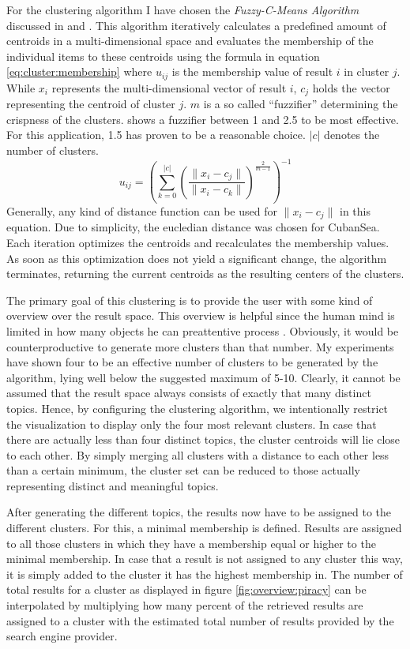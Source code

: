For the clustering algorithm I have chosen the \emph{Fuzzy-C-Means Algorithm} discussed in \cite{Dunn1973} and \cite{Bezdek1981}. This algorithm iteratively calculates a predefined amount of centroids in a multi-dimensional space and evaluates the membership of the individual items to these centroids using the formula in equation \ref{eq:cluster:membership} where $u_{ij}$ is the membership value of result $i$ in cluster $j$. While $x_i$ represents the multi-dimensional vector of result $i$, $c_j$ holds the vector representing the centroid of cluster $j$. $m$ is a so called ``fuzzifier'' determining the crispness of the clusters. \cite{Stutz1999} shows a fuzzifier between 1 and 2.5 to be most effective. For this application, 1.5 has proven to be a reasonable choice. $|c|$ denotes the number of clusters.
\begin{equation}
	u_{ij} = \left(\displaystyle\sum_{k=0}^{|c|} \left(\frac{\|x_i - c_j\|}{\|x_i -c_k\|}\right)^{\frac{2}{m-1}}\right) ^{-1} \label{eq:cluster:membership}
\end{equation}
Generally, any kind of distance function can be used for $\|x_i - c_j\|$ in this equation. Due to simplicity, the eucledian distance  was chosen for CubanSea. Each iteration optimizes the centroids and recalculates the membership values. As soon as this optimization does not yield a significant change, the algorithm terminates, returning the current centroids as the resulting centers of the clusters.

The primary goal of this clustering is to provide the user with some kind of overview over the result space. This overview is helpful since the human mind is limited in how many objects he can preattentive process \cite{Healey1996}. Obviously, it would be counterproductive to generate more clusters than that number. My experiments have shown four to be an effective number of clusters to be generated by the algorithm, lying well below the suggested maximum of 5-10. Clearly, it cannot be assumed that the result space always consists of exactly that many distinct topics. Hence, by configuring the clustering algorithm, we intentionally restrict the visualization to display only the four most relevant clusters. In case that there are actually less than four distinct topics, the cluster centroids will lie close to each other. By simply merging all clusters with a distance to each other less than a certain minimum, the cluster set can be reduced to those actually representing distinct and meaningful topics.

After generating the different topics, the results now have to be assigned to the different clusters. For this, a minimal membership is defined. Results are assigned to all those clusters in which they have a membership equal or higher to the minimal membership. In case that a result is not assigned to any cluster this way, it is simply added to the cluster it has the highest membership in. The number of total results for a cluster as displayed in figure \ref{fig:overview:piracy} can be interpolated by multiplying how many percent of the retrieved results are assigned to a cluster with the estimated total number of results provided by the search engine provider.

